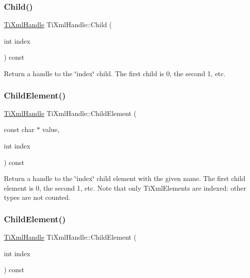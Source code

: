 \subsubsection{\texorpdfstring{Child()}{Child()}\hspace{0.1cm}{\footnotesize\ttfamily [2/2]}}
{\footnotesize\ttfamily \hyperlink{class_ti_xml_handle}{Ti\+Xml\+Handle} Ti\+Xml\+Handle\+::\+Child (\begin{DoxyParamCaption}\item[{int}]{index }\end{DoxyParamCaption}) const}

Return a handle to the \char`\"{}index\char`\"{} child. The first child is 0, the second 1, etc. \mbox{\label{class_ti_xml_handle_afccc59d8a0daa8c5d78474fbed430ddb}} 
\subsubsection{\texorpdfstring{Child\+Element()}{ChildElement()}\hspace{0.1cm}{\footnotesize\ttfamily [1/2]}}
{\footnotesize\ttfamily \hyperlink{class_ti_xml_handle}{Ti\+Xml\+Handle} Ti\+Xml\+Handle\+::\+Child\+Element (\begin{DoxyParamCaption}\item[{const char $\ast$}]{value,  }\item[{int}]{index }\end{DoxyParamCaption}) const}

Return a handle to the \char`\"{}index\char`\"{} child element with the given name. The first child element is 0, the second 1, etc. Note that only Ti\+Xml\+Elements are indexed\+: other types are not counted. \mbox{\label{class_ti_xml_handle_a57a639ab0ac99ff9358f675a1b73049a}} 
\subsubsection{\texorpdfstring{Child\+Element()}{ChildElement()}\hspace{0.1cm}{\footnotesize\ttfamily [2/2]}}
{\footnotesize\ttfamily \hyperlink{class_ti_xml_handle}{Ti\+Xml\+Handle} Ti\+Xml\+Handle\+::\+Child\+Element (\begin{DoxyParamCaption}\item[{int}]{index }\end{DoxyParamCaption}) const}

